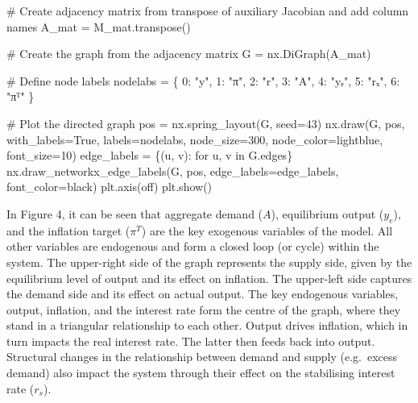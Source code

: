 \documentclass[
  letterpaper,
  DIV=11,
  numbers=noendperiod]{scrreprt}
\newenvironment{Shaded}{\begin{snugshade}}{\end{snugshade}}
\newcommand{\CommentTok}[1]{\textcolor[rgb]{0.37,0.37,0.37}{#1}}
\newcommand{\ControlFlowTok}[1]{\textcolor[rgb]{0.00,0.23,0.31}{#1}}
\newcommand{\DecValTok}[1]{\textcolor[rgb]{0.68,0.00,0.00}{#1}}
\newcommand{\KeywordTok}[1]{\textcolor[rgb]{0.00,0.23,0.31}{#1}}
\newcommand{\NormalTok}[1]{\textcolor[rgb]{0.00,0.23,0.31}{#1}}
\newcommand{\OperatorTok}[1]{\textcolor[rgb]{0.37,0.37,0.37}{#1}}
\newcommand{\StringTok}[1]{\textcolor[rgb]{0.13,0.47,0.30}{#1}}
\newcommand{\VariableTok}[1]{\textcolor[rgb]{0.07,0.07,0.07}{#1}}
\begin{document}
\begin{tcolorbox}
\begin{Shaded}
\begin{Highlighting}[]
\CommentTok{\# Create adjacency matrix from transpose of auxiliary Jacobian and add column names}
\NormalTok{A\_mat }\OperatorTok{=}\NormalTok{ M\_mat.transpose()}

\CommentTok{\# Create the graph from the adjacency matrix}
\NormalTok{G }\OperatorTok{=}\NormalTok{ nx.DiGraph(A\_mat)}

\CommentTok{\# Define node labels}
\NormalTok{nodelabs }\OperatorTok{=}\NormalTok{ \{}
    \DecValTok{0}\NormalTok{: }\StringTok{"y"}\NormalTok{,}
    \DecValTok{1}\NormalTok{: }\StringTok{"π"}\NormalTok{,}
    \DecValTok{2}\NormalTok{: }\StringTok{"r"}\NormalTok{,}
    \DecValTok{3}\NormalTok{: }\StringTok{"A"}\NormalTok{,}
    \DecValTok{4}\NormalTok{: }\StringTok{"yₑ"}\NormalTok{,}
    \DecValTok{5}\NormalTok{: }\StringTok{"rₛ"}\NormalTok{,}
    \DecValTok{6}\NormalTok{: }\StringTok{"πᵀ"}
\NormalTok{\}}

\CommentTok{\# Plot the directed graph}
\NormalTok{pos }\OperatorTok{=}\NormalTok{ nx.spring\_layout(G, seed}\OperatorTok{=}\DecValTok{43}\NormalTok{)  }
\NormalTok{nx.draw(G, pos, with\_labels}\OperatorTok{=}\VariableTok{True}\NormalTok{, labels}\OperatorTok{=}\NormalTok{nodelabs, node\_size}\OperatorTok{=}\DecValTok{300}\NormalTok{, node\_color}\OperatorTok{=}\StringTok{\textquotesingle{}lightblue\textquotesingle{}}\NormalTok{, }
\NormalTok{        font\_size}\OperatorTok{=}\DecValTok{10}\NormalTok{)}
\NormalTok{edge\_labels }\OperatorTok{=}\NormalTok{ \{(u, v): }\StringTok{\textquotesingle{}\textquotesingle{}} \ControlFlowTok{for}\NormalTok{ u, v }\KeywordTok{in}\NormalTok{ G.edges\}}
\NormalTok{nx.draw\_networkx\_edge\_labels(G, pos, edge\_labels}\OperatorTok{=}\NormalTok{edge\_labels, font\_color}\OperatorTok{=}\StringTok{\textquotesingle{}black\textquotesingle{}}\NormalTok{)}
\NormalTok{plt.axis(}\StringTok{\textquotesingle{}off\textquotesingle{}}\NormalTok{)}
\NormalTok{plt.show()}
\end{Highlighting}
\end{Shaded}

\end{tcolorbox}

In Figure 4, it can be seen that aggregate demand (\(A\)), equilibrium
output (\(y_e\)), and the inflation target (\(\pi^T\)) are the key
exogenous variables of the model. All other variables are endogenous and
form a closed loop (or cycle) within the system. The upper-right side of
the graph represents the supply side, given by the equilibrium level of
output and its effect on inflation. The upper-left side captures the
demand side and its effect on actual output. The key endogenous
variables, output, inflation, and the interest rate form the centre of
the graph, where they stand in a triangular relationship to each other.
Output drives inflation, which in turn impacts the real interest rate.
The latter then feeds back into output. Structural changes in the
relationship between demand and supply (e.g.~excess demand) also impact
the system through their effect on the stabilising interest rate
(\(r_s\)).
\end{document}
